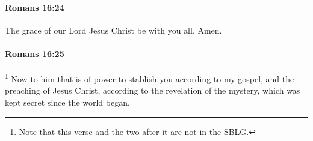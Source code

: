 		\paragraph{Romans 16:24} %
			\label{ROMANS-16-24}

			The grace of our Lord Jesus Christ be with you all. Amen.

			\begin{framed}
			\scriptsize
				\begin{compactdesc}
					\item[SBLG] 
				\end{compactdesc}
			\end{framed}

		\paragraph{Romans 16:25} %
			\label{ROMANS-16-25}

				\footnote{%
					Note that this verse and the two after it are not in the SBLG.
					}%
			Now to him that is of power to stablish you according to my gospel, and the preaching of Jesus Christ, according to the revelation of the mystery, which was kept secret since the world began,

			\begin{framed}
			\scriptsize
				\begin{compactdesc}
					\item[SBLG] \gr{---}
				\end{compactdesc}
			\end{framed}

